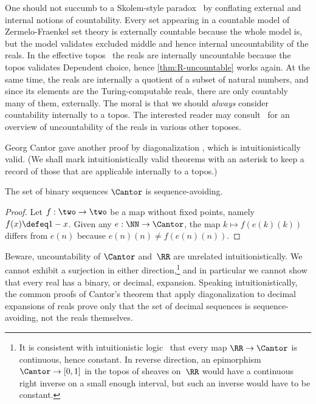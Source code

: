 One should not succumb to a Skolem-style paradox~\cite{skolem23:_einig_bemer_begru_mengen} by conflating external and internal notions of countability.
%
Every set appearing in a countable model of Zermelo-Fraenkel set theory is externally countable because the whole model is, but the model validates excluded middle and hence internal uncountability of the reals.
%
In the effective topos~\cite{hyland82} the reals are internally uncountable because the topos validates Dependent choice, hence \cref{thm:R-uncountable} works again. At the same time, the reals are internally a quotient of a subset of natural numbers, and since its elements are the Turing-computable reals, there are only countably many of them, externally.
%
The moral is that we should \emph{always} consider countability internally to a topos. The interested reader may consult~\cite{blechschmidt18} for an overview of uncountability of the reals in various other toposes.

Georg Cantor gave another proof by diagonalization \cite{cantor79:_ueber_punkt}, which is intuitionistically valid.
%
(We shall mark intuitionistically valid theorems with an asterisk to keep a record of those that are applicable internally to a topos.)

\begin{theoremC}[Cantor]
  \label{cor:cantor-diagonal}
  The set of binary sequences $\Cantor$ is sequence-avoiding.
\end{theoremC}

\begin{proof}
  Let $f : \two \to \two$ be a map without fixed points, namely $f(x) \defeq 1 - x$.
  Given any $e : \NN \to \Cantor$, the map $k \mapsto f(e(k)(k))$ differs from $e(n)$ because $e(n)(n) \neq f(e(n)(n))$.
\end{proof}

Beware, uncountability of $\Cantor$ and~$\RR$ are unrelated intuitionistically.
%
We cannot exhibit a surjection in either direction,\footnote{It is consistent with intuitionistic logic~\cite[Sect.~4.6]{troelstra88:_const_mathem} that every map $\RR \to \Cantor$ is continuous, hence constant. In reverse direction, an epimorphism $\Cantor \to [0,1]$ in the topos of sheaves on~$\RR$ would have a continuous right inverse on a small enough interval, but such an inverse would have to be constant.}
and in particular we cannot show that every real has a binary, or decimal, expansion. Speaking intuitionistically, the common proofs of Cantor's theorem that apply diagonalization to decimal expansions of reals prove only that the set of decimal sequences is sequence-avoiding, not the reals themselves.

